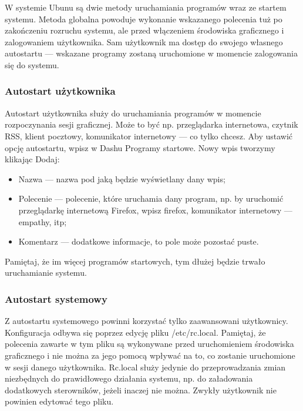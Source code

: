 W systemie Ubunu są dwie metody uruchamiania programów wraz ze startem systemu. Metoda globalna powoduje wykonanie wskazanego polecenia tuż po zakończeniu rozruchu systemu, ale przed włączeniem środowiska graficznego i zalogowaniem użytkownika. Sam użytkownik ma dostęp do swojego własnego autostartu --- wskazane programy zostaną uruchomione w momencie zalogowania się do systemu.

\subsubsection{Autostart użytkownika}
Autostart użytkownika służy do uruchamiania programów w momencie rozpoczynania sesji graficznej. Może to być np. przeglądarka internetowa, czytnik RSS, klient pocztowy, komunikator internetowy --- co tylko chcesz. Aby ustawić opcję autostartu, wpisz w Dashu \textcolor{ubuntu_orange}{Programy startowe}. Nowy wpis tworzymy klikając \textcolor{ubuntu_orange}{Dodaj}:
\begin{itemize}
\item \textcolor{ubuntu_orange}{Nazwa} --- nazwa pod jaką będzie wyświetlany dany wpis;
\item \textcolor{ubuntu_orange}{Polecenie} --- polecenie, które uruchamia dany program, np. by uruchomić przeglądarkę internetową Firefox, wpisz \textcolor{ubuntu_orange}{firefox}, komunikator internetowy --- \textcolor{ubuntu_orange}{empathy}, itp;
\item \textcolor{ubuntu_orange}{Komentarz} --- dodatkowe informacje, to pole może pozostać puste.
\end{itemize}

Pamiętaj, że im więcej programów startowych, tym dłużej będzie trwało uruchamianie systemu.

\subsubsection{Autostart systemowy}
Z autostartu systemowego powinni korzystać tylko zaawansowani użytkownicy. Konfiguracja odbywa się poprzez edycję pliku \textcolor{ubuntu_orange}{/etc/rc.local}. Pamiętaj, że polecenia zawarte w tym pliku są wykonywane przed uruchomieniem środowiska graficznego i nie można za jego pomocą wpływać na to, co zostanie uruchomione w sesji danego użytkownika. Rc.local służy jedynie do przeprowadzania zmian niezbędnych do prawidłowego działania systemu, np. do załadowania dodatkowych sterowników, jeżeli inaczej nie można. Zwykły użytkownik nie powinien edytować tego pliku.
